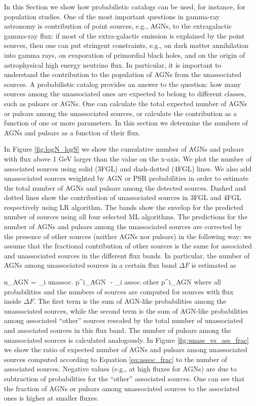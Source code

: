 In this Section we show how probabilistic catalogs can be used, for instance, for population studies.
One of the most important questions in gamma-ray astronomy is contribution of point sources, e.g., AGNs, to the extragalactic gamma-ray
flux:
if most of the extra-galactic emission is explained by the point sources, then one can put stringent constraints, e.g., on 
dark matter annihilation into gamma rays, on evaporation of primordial black holes, and on the origin of astrophysical high energy neutrino flux.
In particular, it is important to understand the contribution to the population of AGNs from the unassociated sources.
A probabilistic catalog provides an answer to the question: how many sources among the unassociated ones are expected to belong to different classes, such as pulsars or AGNs. 
One can calculate the total expected number of AGNs or pulsars among the unassociated sources, or calculate the contribution as a function of one or more parameters.
In this section we determine the numbers of AGNs and pulsars as a function of their flux.

In Figure \ref{fig:logN_logS} we show the cumulative number of AGNs and pulsars with flux above 1 GeV larger than the
value on the x-axis.
We plot the number of associated sources using solid (3FGL) and dash-dotted (4FGL) lines.
We also add unassociated sources weighted by AGN or PSR probabilities in order to estimate the total number of AGNs and pulsars
among the detected sources.
Dashed and dotted lines show the contribution of unassociated sources in 3FGL and 4FGL respectively using LR algorithm.
The bands show the envelop for the predicted number of sources using all four selected ML algorithms.
The predictions for the number of AGNs and pulsars among the unassociated sources are corrected by the presence of other sources (neither AGNs nor pulsars) in the following way:
we assume that the fractional contribution of other sources is the same for associated and unassociated sources in the different flux bands.
In particular, the number of AGNs among unassociated sources in a certain flux band $\Delta F$ is estimated as

\be
{}
n_{\rm AGN} = \sum_{i \in \rm unassoc.} p^i_{\rm AGN}\,\, - \sum_{i \in \rm assoc.\,other} p^i_{\rm AGN} \cdot {}
\ee
where all probabilities and the numbers of sources are computed for sources with flux inside $\Delta F$.
The first term is the sum of AGN-like probabilities among the unassociated sources,
while the second term is the sum of AGN-like probabilities among associated ``other'' sources rescaled by the total number
of unassociated and associated sources in this flux band.
The number of pulsars among the unassociated sources is calculated analogously.
In Figure \ref{fig:unass_vs_ass_frac} we show the ratio of expected number of AGNs and pulsars among unassociated sources computed according to Equation \ref{eq:assoc_frac} to the number of associated sources.
Negative values (e.g., at high fluxes for AGNs) are due to subtraction of probabilities for the ``other'' associated sources.
One can see that the fraction of AGNs or pulsars among unassociated sources to the associated ones is higher at smaller fluxes.

